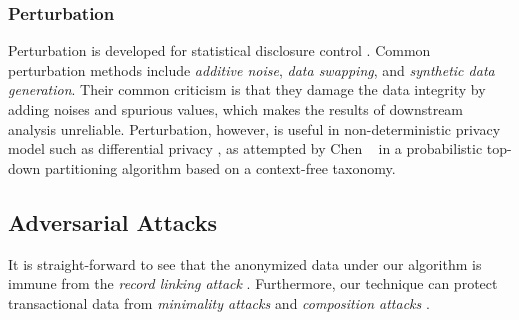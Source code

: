 \subsubsection{Perturbation}

Perturbation is developed for statistical disclosure control
\cite{evfimievski2003limiting,evfimievski2004privacy,FungWCY10:Survey}. Common perturbation methods include {\em additive
noise}, {\em data swapping}, and {\em synthetic data generation}. Their
common criticism is that they damage the data integrity by adding noises and
spurious values, which makes the results of downstream analysis unreliable.
Perturbation, however, is useful in non-deterministic privacy model such as
differential privacy \cite{Dwork08:diff:survey}, as
attempted by Chen \etal~ \cite{ChenMFDX11:Diff} in a probabilistic top-down
partitioning algorithm based on a context-free taxonomy.
%

\subsection{Adversarial Attacks}
It is straight-forward to see that the anonymized data under our algorithm
is immune from the {\em record linking attack} \cite{FungWCY10:Survey,samarati1998}.
Furthermore, our technique can protect transactional data from {\em minimality
attacks} \cite{Wong:2007:Minimality} and {\em composition attacks} \cite{Ganta:2008:Composition}.

